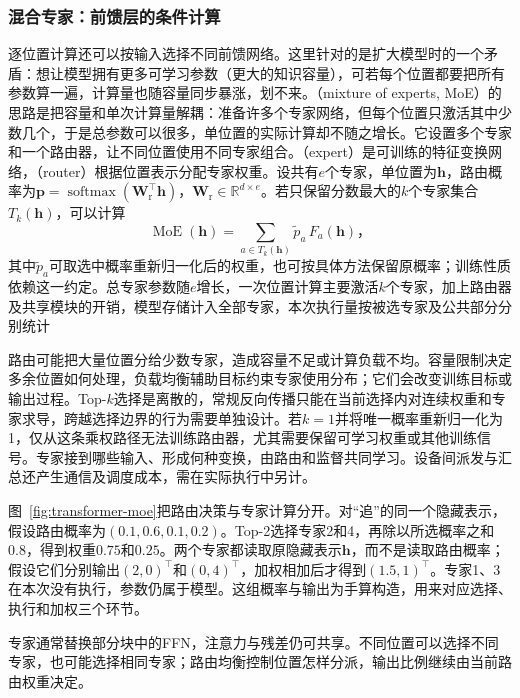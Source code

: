 \FloatBarrier
\subsubsection{混合专家：前馈层的条件计算}
\label{sec:transformer-moe-extensions}

逐位置计算还可以按输入选择不同前馈网络。这里针对的是扩大模型时的一个矛盾：想让模型拥有更多可学习参数（更大的知识容量），可若每个位置都要把所有参数算一遍，计算量也随容量同步暴涨，划不来。（mixture of experts, MoE）的思路是把容量和单次计算量解耦：准备许多个专家网络，但每个位置只激活其中少数几个，于是总参数可以很多，单位置的实际计算却不随之增长。它设置多个专家和一个路由器，让不同位置使用不同专家组合。（expert）是可训练的特征变换网络，（router）根据位置表示分配专家权重。设共有$e$个专家，单位置为$\bm h$，路由概率为$\bm p=\operatorname{softmax}(\bm W_{\mathrm r}^{\top}\bm h)$，$\bm W_{\mathrm r}\in\mathbb R^{d\times e}$。若只保留分数最大的$k$个专家集合$T_k(\bm h)$，可以计算
\begin{equation}
  \operatorname{MoE}(\bm h)
    =\sum_{a\in T_k(\bm h)}\widetilde p_a\,F_a(\bm h)\text{，}
  \label{eq:transformer-moe}
\end{equation}
其中$\widetilde p_a$可取选中概率重新归一化后的权重，也可按具体方法保留原概率；训练性质依赖这一约定。总专家参数随$e$增长，一次位置计算主要激活$k$个专家，加上路由器及共享模块的开销，模型存储计入全部专家，本次执行量按被选专家及公共部分分别统计

路由可能把大量位置分给少数专家，造成容量不足或计算负载不均。容量限制决定多余位置如何处理，负载均衡辅助目标约束专家使用分布；它们会改变训练目标或输出过程。Top-$k$选择是离散的，常规反向传播只能在当前选择内对连续权重和专家求导，跨越选择边界的行为需要单独设计。若$k=1$并将唯一概率重新归一化为1，仅从这条乘权路径无法训练路由器，尤其需要保留可学习权重或其他训练信号。专家接到哪些输入、形成何种变换，由路由和监督共同学习。设备间派发与汇总还产生通信及调度成本，需在实际执行中另计。

图~\ref{fig:transformer-moe}把路由决策与专家计算分开。对“追”的同一个隐藏表示，假设路由概率为$(0.1,0.6,0.1,0.2)$。Top-2选择专家2和4，再除以所选概率之和$0.8$，得到权重$0.75$和$0.25$。两个专家都读取原隐藏表示$\bm h$，而不是读取路由概率；假设它们分别输出$(2,0)^{\top}$和$(0,4)^{\top}$，加权相加后才得到$(1.5,1)^{\top}$。专家1、3在本次没有执行，参数仍属于模型。这组概率与输出为手算构造，用来对应选择、执行和加权三个环节。

专家通常替换部分块中的FFN，注意力与残差仍可共享。不同位置可以选择不同专家，也可能选择相同专家；路由均衡控制位置怎样分派，输出比例继续由当前路由权重决定。


